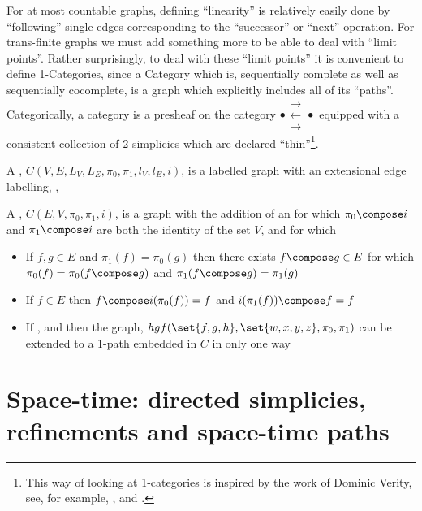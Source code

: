 \documentclass[a4paper]{amsart}
\begin{document}
For at most countable graphs, defining ``linearity'' is relatively easily done by
``following'' single edges corresponding to the ``successor'' or ``next'' operation. For
trans-finite graphs we must add something more to be able to deal with ``limit points''.
Rather surprisingly, to deal with these ``limit points'' it is convenient to define
1-Categories, since a Category which is, sequentially complete as well as sequentially
cocomplete, is a graph which explicitly includes all of its ``paths''. Categorically, a
category is a presheaf on the category
$ \bullet \substack{\mathbf{\longrightarrow} \\[-0.7ex] \mathbf{\longleftarrow} 
\\[-0.7ex] \mathbf{\longrightarrow} } \bullet $
equipped with a consistent collection of 2-simplicies which are declared
``thin''\footnote{This way of looking at 1-categories is inspired by the work of Dominic
Verity, see, for example, \cite{verity2005complicialSets},
\cite{verity2006complicialSimplicialHomotopy} and
\cite{verity2006simplicialComplicialCategories}.}.

\begin{definition}
A , $C(V, E, L_V, L_E, \pi_0, \pi_1, l_V, l_E, i)$, is a labelled graph 
with an extensional edge labelling, , 
\end{definition}


\begin{definition}
A , $C(E, V, \pi_0, \pi_1, i)$, is a graph with the addition of an 
  for which $\pi_0 \compose i$ and $\pi_1 
\compose i$ are both the identity of the set $V$, and for which 
\begin{itemize}
\item If $f, g \in E$ and $\pi_1(f) = \pi_0(g)$ then there exists $f \compose g \in E$ for 
which $ \pi_0(f) = \pi_0(f \compose g)$ and $ \pi_1(f \compose g) = \pi_1(g)$
\item If $f \in E$ then $ f \compose i(\pi_0(f)) = f$ and $i(\pi_1(f)) \compose f = f$
\item If ,  and  then the graph, $hgf(\set{f,
g, h}, \set{w, x, y, z}, \pi_0, \pi_1)$ can be extended to a 1-path embedded in $C$ in only 
one way
\end{itemize}
\end{definition}

\section{Space-time: directed simplicies, refinements and space-time paths}
\end{document}
